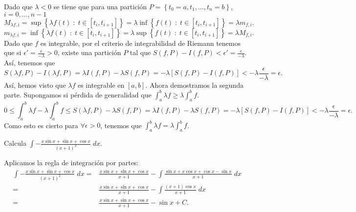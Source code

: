 \documentclass{article}
\begin{document}
\begin{sol}
	Dado que $\displaystyle \lambda < 0 $ se tiene que para una partición $\displaystyle P = \left\{ t_{0} = a, t_{1}, \ldots, t_{n} = b\right\}  $, $\displaystyle i = 0, \ldots, n-1 $ 
\[ M_{\lambda f, i} = \sup \left\{ \lambda f\left(t\right) \; : \; t \in \left[t_{i}, t_{i+1}\right] \right\} = \lambda \inf \left\{ f \left(t\right) \; : \; t \in \left[t_{i}, t_{i+1}\right] \right\} = \lambda m_{f,i}.\]
\[m_{\lambda f, i} = \inf \left\{ \lambda f\left(t\right) \; : \; t \in \left[t_{i}, t_{i+1}\right] \right\} = \lambda \sup \left\{ f\left(t\right) \; : \; t \in \left[t_{i}, t_{i+1}\right] \right\} = \lambda M_{f, i} .\]
Dado que $\displaystyle f $ es integrable, por el criterio de integrabilidad de Riemann tenemos que si $\displaystyle \epsilon' = \frac{\epsilon }{-\lambda}> 0 $, existe una partición $\displaystyle P $ tal que $\displaystyle S\left(f,P\right)-I\left(f,P\right) < \epsilon' = \frac{\epsilon }{-\lambda }  $. Así, tenemos que 
\[
	S\left(\lambda f, P\right)-I\left(\lambda f, P\right) = \lambda I\left(f,P\right) - \lambda S\left(f,P\right) = -\lambda \left[S\left(f,P\right)-I\left(f,P\right)\right] < -\lambda \frac{\epsilon }{-\lambda } = \epsilon .
\]
Así, hemos visto que $\displaystyle \lambda f $ es integrable en $\displaystyle \left[a,b\right]  $. Ahora demostramos la segunda parte. Supongamos si pérdida de generalidad que $\displaystyle \int^{b}_{a} \lambda f \geq \lambda \int^{b}_{a} f  $. 
\[0 \leq \int^{b}_{a} \lambda f - \lambda \int^{b}_{a} f \leq S\left(\lambda f, P\right)- \lambda S\left(f,P\right) = \lambda I\left(f,P\right)-\lambda S\left(f,P\right) = - \lambda \left[S\left(f,P\right)-I\left(f,P\right)\right] < -\lambda \frac{\epsilon }{-\lambda } = \epsilon  .\]
Como esto es cierto para $\displaystyle \forall \epsilon > 0 $, tenemos que $\displaystyle \int^{b}_{a} \lambda f = \lambda \int^{b}_{a} f $.
\end{sol}
\begin{ej}
Calcula $\displaystyle \int -\frac{x\sin x + \sin x + \cos x}{\left(x+1\right)^{2}} \; dx $.
\end{ej}
\begin{sol}
Aplicamos la regla de integración por partes:
\[
\begin{split}
	\int -\frac{x\sin x + \sin x + \cos x}{\left(x+1\right)^{2}} \; dx = & \frac{x\sin x + \sin x + \cos x}{x + 1} - \int \frac{\sin x + x \cos x + \cos x - \sin x}{x + 1} \; dx \\
	= & \frac{x\sin x + \sin x + \cos x}{x + 1} - \int \frac{\left(x+1\right)\cos x}{x + 1} \; dx \\
	= & \frac{x\sin x + \sin x + \cos x}{x+1} - \sin x + C .
\end{split}
\]
\end{sol}
\end{document}
